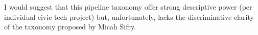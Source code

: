 I would suggest that this pipeline taxonomy offer strong descriptive power (per individual civic tech project) but, unfortunately, lacks the discriminative clarity of the taxonomy proposed by Micah Sifry.